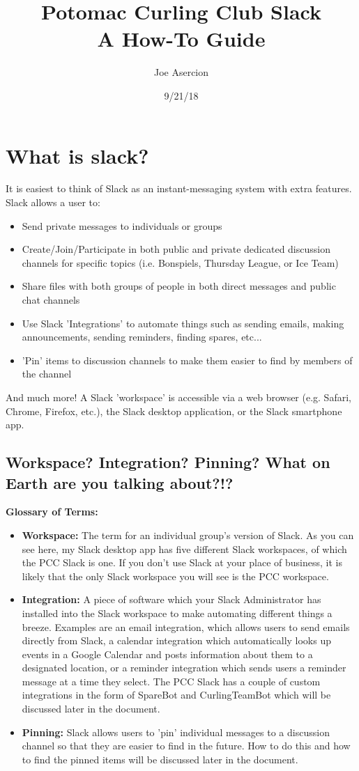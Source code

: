 \documentclass[12pt]{scrartcl}
\title{Potomac Curling Club Slack\\
	\large A How-To Guide}
\author{Joe Asercion}
\date{9/21/18}
\newcommand{\n}{\newline}
\begin{document}
	\maketitle
	\section{What is slack?}
	It is easiest to think of Slack as an instant-messaging system with extra features.  Slack allows a user to:
	\begin{itemize}
		\item Send private messages to individuals or groups
		\item Create/Join/Participate in both public and private dedicated discussion channels for specific topics (i.e. Bonspiels, Thursday League, or Ice Team)
		\item Share files with both groups of people in both direct messages and public chat channels
		\item Use Slack 'Integrations' to automate things such as sending emails, making  announcements, sending reminders, finding spares, etc...
		\item 'Pin' items to discussion channels to make them easier to find by members of the channel
	\end{itemize}
	And much more!  A Slack 'workspace' is accessible via a web browser (e.g. Safari, Chrome, Firefox, etc.), the Slack desktop application, or the Slack smartphone app.
	
	\subsection{Workspace? Integration? Pinning? What on Earth are you talking about?!?}
	\textbf{Glossary of Terms: \n}
	\begin{itemize}
			\item \textbf{Workspace:} The term for an individual group's version of Slack.  As you can see here, my Slack desktop app has five different Slack workspaces, of which the PCC Slack is one.  If you don't use Slack at your place of business, it is likely that the only Slack workspace you will see is the PCC workspace.
			\item \textbf{Integration:} A piece of software which your Slack Administrator has installed into the Slack workspace to make automating different things a breeze.  Examples are an email integration, which allows users to send emails directly from Slack, a calendar integration which automatically looks up events in a Google Calendar and posts information about them to a designated location, or a reminder integration which sends users a reminder message at a time they select.  The PCC Slack has a couple of custom integrations in the form of SpareBot and CurlingTeamBot which will be discussed later in the document.
			\item \textbf{Pinning:} Slack allows users to 'pin' individual messages to a discussion channel so that they are easier to find in the future.  How to do this and how to find the pinned items will be discussed later in the document.
	\end{itemize}
	
\end{document}
